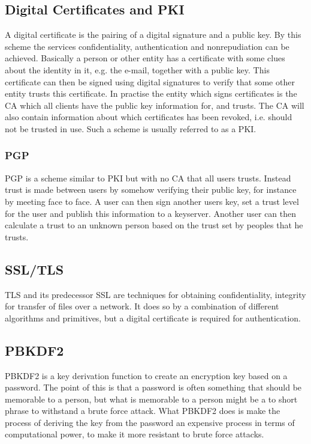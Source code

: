 \documentclass[pdftex,english,10pt,b5paper,twoside]{book}
\begin{document}
\subsection{Digital Certificates and PKI} A digital certificate is the pairing
of a digital signature and a public key\cite{stallings}.  By this scheme the
services confidentiality, authentication and nonrepudiation can be achieved.
Basically a person or other entity has a certificate with some clues about the
identity in it, e.g. the e-mail, together with a public key. This certificate
can then be signed using digital signatures to verify that some other entity
trusts this certificate. In practise the entity which signs certificates is the
\ac{CA} which all clients have the public key information for, and trusts. The
\ac{CA} will also contain information about which certificates has been
revoked, i.e. should not be trusted in use. Such a scheme is usually referred
to as a \ac{PKI}.

\subsubsection{PGP} \ac{PGP} is a scheme similar to \ac{PKI} but with no
\ac{CA} that all users trusts\cite{stallings}. Instead trust is made between
users by somehow verifying their public key, for instance by meeting face to
face. A user can then sign another users key, set a trust level for the user
and publish this information to a keyserver. Another user can then calculate a
trust to an unknown person based on the trust set by peoples that he trusts.

\subsection{SSL/TLS}
\ac{TLS} and its predecessor \ac{SSL} are techniques for obtaining
confidentiality, integrity for transfer of files over a
network\cite{stallings}. It does so by a combination of different algorithms
and primitives, but a digital certificate is required for authentication.

\subsection{PBKDF2}
\ac{PBKDF2} is a key derivation function to create an encryption key based on
a password. The point of this is that a password is often something that should
be memorable to a person, but what is memorable to a person might be a to short
phrase to withstand a brute force attack. What \ac{PBKDF2} does is make the
process of deriving the key from the password an expensive process in terms of
computational power, to make it more resistant to brute force attacks.
\end{document}

